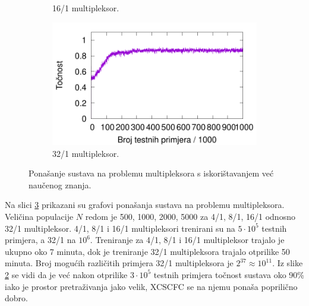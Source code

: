 \documentclass[times, utf8, zavrsni]{fer}
\begin{document}
\begin{figure}[!h]
\begin{subfigure}{0.496\textwidth}
        \caption{16/1 multipleksor.}
        \label{fig:20muxre}
    \end{subfigure}
    \begin{subfigure}{0.496\textwidth}
        \centering
        \includegraphics[width=\textwidth]{img/multiplexer/37muxre.pdf}
        \caption{32/1 multipleksor.}
        \label{fig:37muxre}
    \end{subfigure}
    \caption{Ponašanje sustava na problemu multipleksora s iskorištavanjem već naučenog znanja.}
    \label{fig:muxre}
\end{figure}
Na slici \ref{fig:muxre} prikazani su grafovi ponašanja sustava na problemu multipleksora.
Veličina populacije $N$ redom je 500, 1000, 2000, 5000 za 4/1, 8/1, 16/1 odnosno 32/1 multipleksor.
4/1, 8/1 i 16/1 multipleksori trenirani su na $5 \cdot 10^{5}$ testnih primjera, a 32/1 na $10^{6}$.
Treniranje za 4/1, 8/1 i 16/1 multipleksor trajalo je ukupno oko 7 minuta, dok je treniranje 32/1 multipleksora trajalo otprilike 50 minuta.
Broj mogućih različitih primjera 32/1 multipleksora je $2^{37} \approx 10^{11}$.
Iz slike \ref{fig:37muxre} se vidi da je već nakon otprilike $3 \cdot 10^{5}$ testnih primjera točnost sustava oko 90\% iako je prostor pretraživanja jako velik, XCSCFC se na njemu ponaša poprilično dobro.
\end{document}
